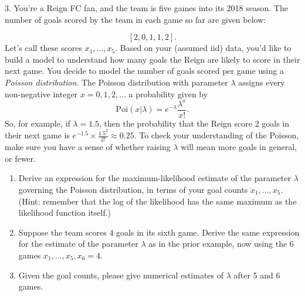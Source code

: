 3. You're a Reign FC fan, and the team is five games into its 2018 season. The
number of goals scored by the team in each game so far are given below:

\[
  [2, 0, 1, 1, 2].
\]
Let's call these scores $x_1, \dots, x_5$. Based on your (assumed iid)
data, you'd like to build a model to understand how many goals the
Reign are likely to score in their next game. You decide to model the
number of goals scored per game using a \emph{Poisson
  distribution}. The Poisson distribution with parameter $\lambda$
assigns every non-negative integer $x = 0, 1, 2, \dots$ a probability
given by
\[
  \mathrm{Poi}(x | \lambda) = e^{-\lambda} \frac{\lambda ^ x}{x!}.
\]
So, for example, if $\lambda = 1.5$, then the probability that the
Reign score 2 goals in their next game is
$e^{-1.5} \times \frac{1.5^2}{2!} \approx 0.25$. To check your
understanding of the Poisson, make sure you have a sense of whether
raising $\lambda$ will mean more goals in general, or fewer.

\begin{enumerate}
\item {} Derive an expression for the maximum-likelihood
  estimate of the parameter $\lambda$ governing the Poisson
  distribution, in terms of your goal counts $x_1, \dots,
  x_5$. (Hint: remember that the log of the likelihood has the same
  maximum as the likelihood function itself.)
    
    
\item {} Suppose the team scores 4 goals in its sixth
  game. Derive the same expression for the estimate of the parameter
  $\lambda$ as in the prior example, now using the 6 games
  $x_1, \ldots, x_5, x_6 =4$.
    

\item {} Given the goal counts, please give  numerical
  estimates of $\lambda$ after 5 and 6 games.
    
\end{enumerate}
